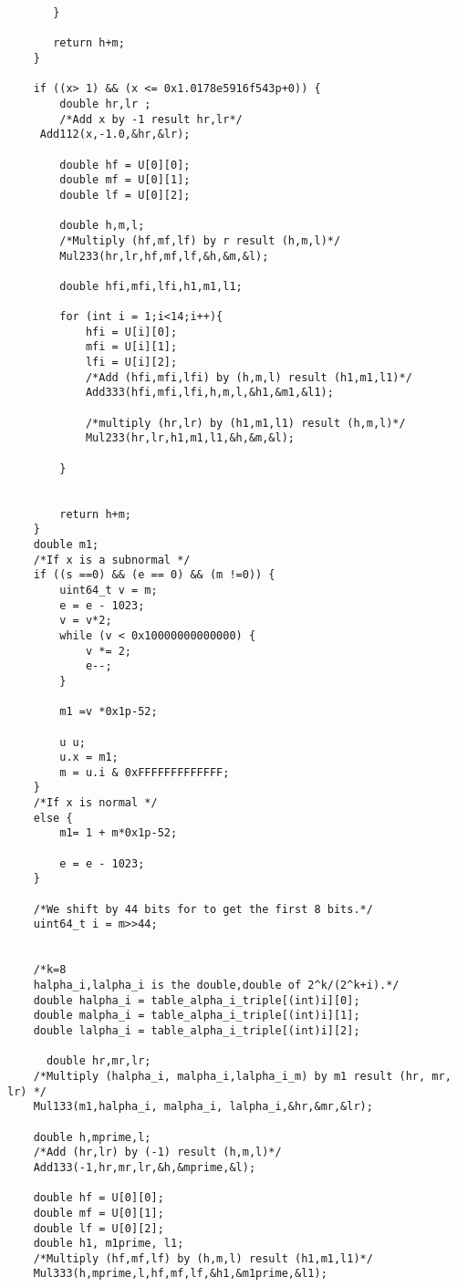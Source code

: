 \begin{lstlisting}
       }
        
       return h+m;
    }
    
    if ((x> 1) && (x <= 0x1.0178e5916f543p+0)) {
        double hr,lr ;
        /*Add x by -1 result hr,lr*/
     Add112(x,-1.0,&hr,&lr);
        
        double hf = U[0][0];
        double mf = U[0][1];
        double lf = U[0][2];
        
        double h,m,l;
        /*Multiply (hf,mf,lf) by r result (h,m,l)*/
        Mul233(hr,lr,hf,mf,lf,&h,&m,&l);
        
        double hfi,mfi,lfi,h1,m1,l1;

        for (int i = 1;i<14;i++){
            hfi = U[i][0];
            mfi = U[i][1];
            lfi = U[i][2];
            /*Add (hfi,mfi,lfi) by (h,m,l) result (h1,m1,l1)*/
            Add333(hfi,mfi,lfi,h,m,l,&h1,&m1,&l1);

            /*multiply (hr,lr) by (h1,m1,l1) result (h,m,l)*/
            Mul233(hr,lr,h1,m1,l1,&h,&m,&l);
            
        }
        
       
        return h+m;
    }
    double m1;
    /*If x is a subnormal */
    if ((s ==0) && (e == 0) && (m !=0)) {
        uint64_t v = m;
        e = e - 1023;
        v = v*2;
        while (v < 0x10000000000000) {
            v *= 2;
            e--;
        }
        
        m1 =v *0x1p-52;
       
        u u;
        u.x = m1;
        m = u.i & 0xFFFFFFFFFFFFF;
    }
    /*If x is normal */
    else {
        m1= 1 + m*0x1p-52;
       
        e = e - 1023;
    }

    /*We shift by 44 bits for to get the first 8 bits.*/
    uint64_t i = m>>44;
    
    
    /*k=8
    halpha_i,lalpha_i is the double,double of 2^k/(2^k+i).*/
    double halpha_i = table_alpha_i_triple[(int)i][0];
    double malpha_i = table_alpha_i_triple[(int)i][1];
    double lalpha_i = table_alpha_i_triple[(int)i][2];

      double hr,mr,lr;
    /*Multiply (halpha_i, malpha_i,lalpha_i_m) by m1 result (hr, mr, lr) */
    Mul133(m1,halpha_i, malpha_i, lalpha_i,&hr,&mr,&lr);
    
    double h,mprime,l;
    /*Add (hr,lr) by (-1) result (h,m,l)*/
    Add133(-1,hr,mr,lr,&h,&mprime,&l);
    
    double hf = U[0][0];
    double mf = U[0][1];
    double lf = U[0][2];
    double h1, m1prime, l1;
    /*Multiply (hf,mf,lf) by (h,m,l) result (h1,m1,l1)*/
    Mul333(h,mprime,l,hf,mf,lf,&h1,&m1prime,&l1);
    

\end{lstlisting}
